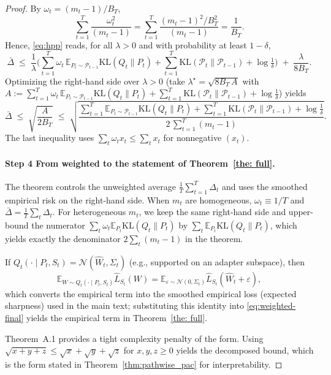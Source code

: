 \documentclass[10pt]{article} %
\begin{document}
\begin{proof}
By $\omega_t=(m_t-1)/B_T$,
\[
\sum_{t=1}^T \frac{\omega_t^2}{(m_t-1)}
=\sum_{t=1}^T \frac{(m_t-1)^2/B_T^2}{(m_t-1)}
=\frac{1}{B_T}.
\]
Hence, \eqref{eq:hpp} reads, for all $\lambda>0$ and with probability at least $1-\delta$,
\begin{equation}
\label{eq:gap-preopt}
\bar\Delta
\;\le\;
\frac{1}{\lambda}\Big(
\sum_{t=1}^T \omega_t\,\mathbb E_{P_t\sim\mathcal P_{t-1}}\mathrm{KL}(Q_t\|P_t)
+ \sum_{t=1}^T \mathrm{KL}(\mathcal P_t\|\mathcal P_{t-1})
+ \log\tfrac1\delta\Big)
\;+\;
\frac{\lambda}{8B_T}.
\end{equation}
Optimizing the right-hand side over $\lambda>0$ (take $\lambda^\star=\sqrt{8B_T\,A}$ with
$A:=\sum_{t=1}^T \omega_t\,\mathbb E_{P_t\sim\mathcal P_{t-1}}\mathrm{KL}(Q_t\|P_t)
+ \sum_{t=1}^T \mathrm{KL}(\mathcal P_t\|\mathcal P_{t-1}) + \log\tfrac1\delta$) yields
\begin{equation}
\label{eq:weighted-final}
\bar\Delta
\;\le\;
\sqrt{\frac{A}{2B_T}}
\;\le\;
\sqrt{\frac{
\sum_{t=1}^T \mathbb E_{P_t\sim\mathcal P_{t-1}}\mathrm{KL}(Q_t\|P_t)
+ \sum_{t=1}^T \mathrm{KL}(\mathcal P_t\|\mathcal P_{t-1})
+ \log\tfrac1\delta}{2\,\sum_{t=1}^T (m_t-1)}}.
\end{equation}
The last inequality uses $\sum_t \omega_t x_t \le \sum_t x_t$ for nonnegative $(x_t)$.

\paragraph{Step 4 From weighted to the statement of Theorem~\ref{the: full}.}
The theorem controls the unweighted average $\frac1T\sum_{t=1}^T \Delta_t$ and uses the smoothed empirical risk on the right-hand side.
When $m_t$ are homogeneous, $\omega_t\equiv 1/T$ and $\bar\Delta=\frac1T\sum_t\Delta_t$.
For heterogeneous $m_t$, we keep the same right-hand side and upper-bound the numerator $\sum_t \omega_t \mathbb E_{P_t}\mathrm{KL}(Q_t\|P_t)$ by $\sum_t \mathbb E_{P_t}\mathrm{KL}(Q_t\|P_t)$, which yields exactly the denominator $2\sum_t(m_t-1)$ in the theorem.


If $Q_t(\cdot\mid P_t,S_t)=\mathcal N(\hat W_t,\Sigma_t)$ (e.g., supported on an adapter subspace), then
\[
\mathbb E_{W\sim Q_t(\cdot\mid P_t,S_t)}\hat L_{S_t}(W)
=\mathbb E_{\varepsilon\sim\mathcal N(0,\Sigma_t)}\hat L_{S_t}(\hat W_t+\varepsilon),
\]
which converts the empirical term into the smoothed empirical loss (expected sharpness) used in the main text; substituting this identity into \eqref{eq:weighted-final} yields the empirical term in Theorem~\ref{the: full}.

Theorem~A.1 provides a tight complexity penalty of the form.
Using $\sqrt{x+y+z}\le \sqrt{x}+\sqrt{y}+\sqrt{z}$ for $x,y,z\ge 0$ yields the decomposed bound, which is the form stated in Theorem~\ref{thm:pathwise_pac} for interpretability.

\end{proof}
\end{document}
